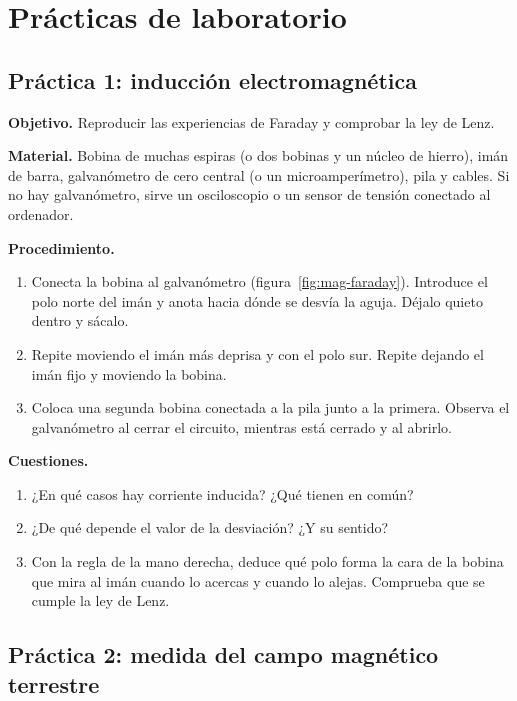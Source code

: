 \section{Prácticas de laboratorio}\label{sec:mag-practicas}

\subsection{Práctica 1: inducción electromagnética}\label{subsec:mag-practica-induccion}

\textbf{Objetivo.} Reproducir las experiencias de Faraday y comprobar la ley de Lenz.

\textbf{Material.} Bobina de muchas espiras (o dos bobinas y un núcleo de hierro), imán de barra, galvanómetro de cero central (o
un microamperímetro), pila y cables. Si no hay galvanómetro, sirve un osciloscopio o un sensor de tensión conectado al ordenador.

\textbf{Procedimiento.}
\begin{enumerate}[label=\numberballmDarkTeal]
    \item Conecta la bobina al galvanómetro (figura~\ref{fig:mag-faraday}). Introduce el polo norte del imán y anota hacia dónde se
    desvía la aguja. Déjalo quieto dentro y sácalo.
    \item Repite moviendo el imán más deprisa y con el polo sur. Repite dejando el imán fijo y moviendo la bobina.
    \item Coloca una segunda bobina conectada a la pila junto a la primera. Observa el galvanómetro al cerrar el circuito, mientras
    está cerrado y al abrirlo.
\end{enumerate}

\textbf{Cuestiones.}
\begin{enumerate}[label=\letraminuscula]
    \item ¿En qué casos hay corriente inducida? ¿Qué tienen en común?
    \item ¿De qué depende el valor de la desviación? ¿Y su sentido?
    \item Con la regla de la mano derecha, deduce qué polo forma la cara de la bobina que mira al imán cuando lo acercas y cuando lo
    alejas. Comprueba que se cumple la ley de Lenz.
\end{enumerate}

\subsection{Práctica 2: medida del campo magnético terrestre}\label{subsec:mag-practica-tangentes}

